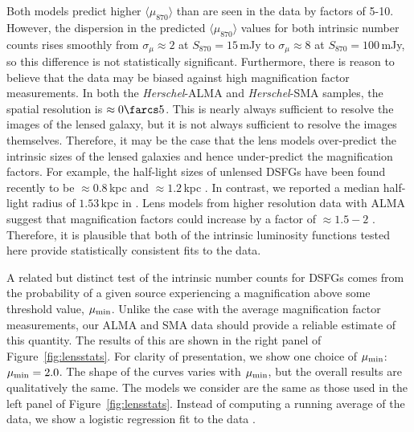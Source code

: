\documentclass[iop]{emulateapj}
\begin{document}

Both models predict higher $\langle\mu_{870}\rangle$ than are seen in the data
by factors of 5-10.  However, the dispersion in the predicted
$\langle\mu_{870}\rangle$ values for both intrinsic number counts rises
smoothly from $\sigma_\mu \approx 2$ at $S_{870} = 15\,$mJy to $\sigma_\mu
\approx 8$ at $S_{870} = 100\,$mJy, so this difference is not statistically
significant.  Furthermore, there is reason to believe that the data may be
biased against high magnification factor measurements.  In both the {\it
Herschel}-ALMA and {\it Herschel}-SMA samples, the spatial resolution is
$\approx 0\farcs5$.  This is nearly always sufficient to resolve the images of
the lensed galaxy, but it is not always sufficient to resolve the images
themselves.  Therefore, it may be the case that the lens models over-predict
the intrinsic sizes of the lensed galaxies and hence under-predict the
magnification factors.  For example, the half-light sizes of unlensed DSFGs
have been found recently to be $\approx 0.8 \,$kpc \citep{Ikarashi:2014nr} and
$\approx1.2\,$kpc \citep{Simpson:2015ty}.  In contrast, we reported a median
half-light radius of $1.53\,$kpc in \citet{Bussmann:2013lr}.  Lens models from
higher resolution data with ALMA suggest that magnification factors could
increase by a factor of $\approx 1.5-2$ \citep{Rybak:2015fk, Tamura:2015lq,
Dye:2015fp}.  Therefore, it is plausible that both of the intrinsic luminosity
functions tested here provide statistically consistent fits to the data.

A related but distinct test of the intrinsic number counts for DSFGs
comes from the probability of a given source experiencing a magnification above
some threshold value, $\mu_{\rm min}$.  Unlike the case with the average
magnification factor measurements, our ALMA and SMA data should provide a
reliable estimate of this quantity.  The results of this are shown in the right
panel of Figure~\ref{fig:lensstats}.  For clarity of presentation, we show one
choice of $\mu_{\rm min}$: $\mu_{\rm min} = 2.0$.  The shape of the curves
varies with  $\mu_{\rm min}$, but the overall results are qualitatively the
same.  The models we consider are the same as those used in the left panel of
Figure~\ref{fig:lensstats}.  Instead of computing a running average of the
data, we show a logistic regression fit to the data \citep[obtained with the
{\sc Scikit-learn} package;][]{scikitlearn}.
\end{document}
